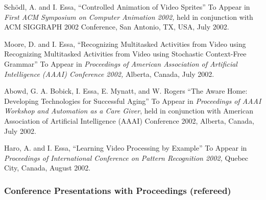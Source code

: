 \begin{pub}
\item Sch\"{o}dl, A. and I. Essa, ``Controlled Animation of Video Sprites'' To Appear in \textit{First ACM Symposium on Computer Animation 2002,} held in conjunction with ACM SIGGRAPH 2002 Conference, San Antonio, TX, USA, July 2002. \label{pub:schoedl02a}

\item Moore, D. and I. Essa, ``Recognizing Multitasked Activities from Video using Recognizing Multitasked Activities from Video using Stochastic Context-Free Grammar'' To Appear in \textit{Proceedings of American Association of Artificial Intelligence (AAAI) Conference 2002,} Alberta, Canada, July 2002. \label{pub:moore02a}

\item Abowd, G. A. Bobick, I. Essa, E. Mynatt, and W. Rogers ``The Aware Home: Developing Technologies for Successful Aging'' To Appear in \textit{Proceedings of AAAI Workshop and Automation as a Care Giver}, held in conjunction with American Association of Artificial Intelligence (AAAI) Conference 2002, Alberta, Canada, July 2002. \label{pub:abowd02a}

\item Haro, A. and I. Essa, ``Learning Video Processing by Example'' To Appear in \textit{Proceedings of International Conference on Pattern Recognition 2002,} Quebec City, Canada, August 2002. \label{pub:haro02a}

\end{pub}

\subsubsection{Conference Presentations with Proceedings (refereed)}
\label{subsubsec:conference-refereed}


